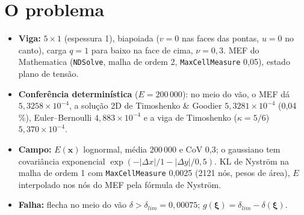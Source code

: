 \documentclass[11pt,a4paper]{article}
\begin{document}
\section{O problema}
\begin{itemize}
  \item \textbf{Viga:} $5 \times 1$ (espessura 1), biapoiada ($v = 0$ nas faces das pontas, $u = 0$ no canto), carga
    $q = 1$ para baixo na face de cima, $\nu = 0{,}3$. MEF do Mathematica (\texttt{NDSolve}, malha de ordem 2,
    \texttt{MaxCellMeasure} 0,05), estado plano de tensão.
  \item \textbf{Conferência determinística} ($E = 200\,000$): no meio do vão, o MEF dá $5{,}3258\times10^{-4}$, a
    solução 2D de Timoshenko \& Goodier $5{,}3281\times10^{-4}$ (0,04\,\%), Euler--Bernoulli $4{,}883\times10^{-4}$ e a viga
    de Timoshenko ($\kappa = 5/6$) $5{,}370\times10^{-4}$.
  \item \textbf{Campo:} $E(\bm x)$ lognormal, média 200\,000 e CoV 0,3; o gaussiano tem covariância exponencial
    $\exp(-|\Delta x|/1 - |\Delta y|/0{,}5)$. KL de Nyström na malha de ordem 1 com \texttt{MaxCellMeasure} 0,0025
    (2121 nós, pesos de área), $E$ interpolado nos nós do MEF pela fórmula de Nyström.
  \item \textbf{Falha:} flecha no meio do vão $\delta > \delta_{lim} = 0{,}00075$; $g(\bm\xi) = \delta_{lim} - \delta(\bm\xi)$.
\end{itemize}
\end{document}
